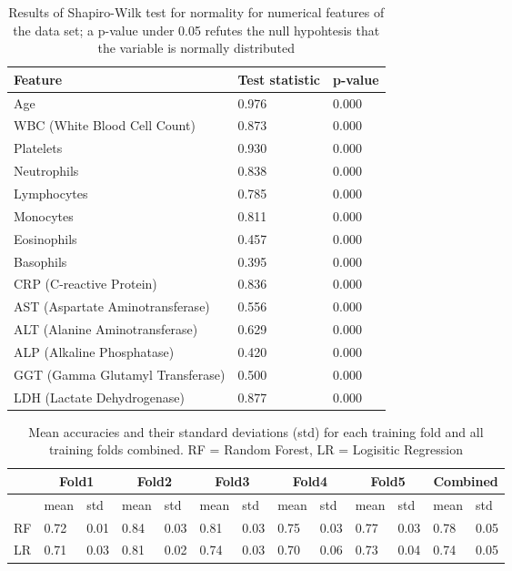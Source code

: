 \begin{table}
\begin{tabular}{lll}
Feature                          & Test statistic & p-value \\ \hline
Age                              & 0.976          & 0.000   \\
WBC (White Blood Cell Count)     & 0.873          & 0.000   \\
Platelets                        & 0.930          & 0.000   \\
Neutrophils                      & 0.838          & 0.000   \\
Lymphocytes                      & 0.785          & 0.000   \\
Monocytes                        & 0.811          & 0.000   \\
Eosinophils                      & 0.457          & 0.000   \\
Basophils                        & 0.395          & 0.000   \\
CRP (C-reactive Protein)         & 0.836          & 0.000   \\
AST (Aspartate Aminotransferase) & 0.556          & 0.000   \\
ALT (Alanine Aminotransferase)   & 0.629          & 0.000   \\
ALP (Alkaline Phosphatase)       & 0.420          & 0.000   \\
GGT (Gamma Glutamyl Transferase) & 0.500          & 0.000   \\
LDH (Lactate Dehydrogenase)      & 0.877          & 0.000  
\end{tabular}
\caption{Results of Shapiro-Wilk test for normality for numerical features of 
the data set; a p-value under 0.05 refutes the null hypohtesis that the 
variable is normally distributed}
\label{tab:shapiro-wilk}
\end{table}

\begin{table}
\centering
\begin{tabular}{lllllllllllll}
 &
  \multicolumn{2}{c}{Fold1} &
  \multicolumn{2}{c}{Fold2} &
  \multicolumn{2}{c}{Fold3} &
  \multicolumn{2}{c}{Fold4} &
  \multicolumn{2}{c}{Fold5} &
  \multicolumn{2}{c}{Combined} \\ \hline
                    & mean & std  & mean & std  & mean & std  & mean & std  & 
mean & std  & mean & std  \\ \hline
RF       & 0.72 & 0.01 & 0.84 & 0.03 & 0.81 & 0.03 & 0.75 & 0.03 & 
0.77 & 0.03 & 0.78 & 0.05 \\
LR & 0.71 & 0.03 & 0.81 & 0.02 & 0.74 & 0.03 & 0.70 & 0.06 & 
0.73 & 0.04 & 0.74 & 0.05
\end{tabular}
\caption{Mean accuracies and their standard deviations (std) 
for each training fold and all training folds combined. RF = Random Forest, 
LR = Logisitic Regression }
\label{tab:training-acc}
\end{table}

